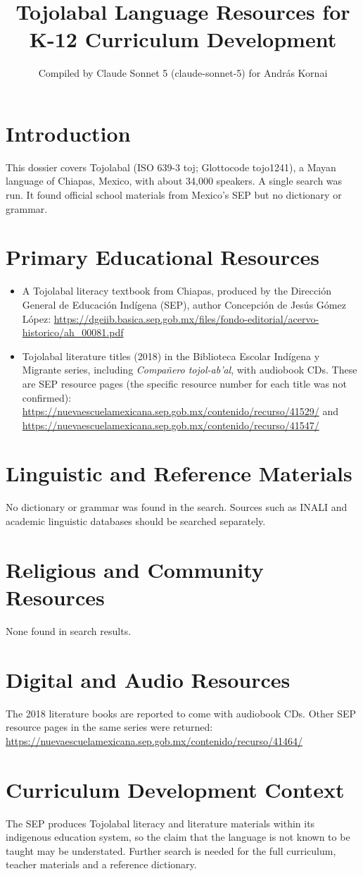 \documentclass[12pt]{article}
\title{Tojolabal Language Resources for K-12 Curriculum Development}
\author{Compiled by Claude Sonnet 5 (claude-sonnet-5) for Andr\'as Kornai}
\date{}
\begin{document}
\maketitle

\section{Introduction}
This dossier covers Tojolabal (ISO 639-3 toj; Glottocode tojo1241), a Mayan language of Chiapas, Mexico, with about 34,000 speakers. A single search was run. It found official school materials from Mexico's SEP but no dictionary or grammar.

\section{Primary Educational Resources}
\begin{itemize}
\item A Tojolabal literacy textbook from Chiapas, produced by the Direcci\'on General de Educaci\'on Ind\'igena (SEP), author Concepci\'on de Jes\'us G\'omez L\'opez: \url{https://dgeiib.basica.sep.gob.mx/files/fondo-editorial/acervo-historico/ah_00081.pdf}
\item Tojolabal literature titles (2018) in the Biblioteca Escolar Ind\'igena y Migrante series, including \emph{Compa\~nero tojol-ab'al}, with audiobook CDs. These are SEP resource pages (the specific resource number for each title was not confirmed): \url{https://nuevaescuelamexicana.sep.gob.mx/contenido/recurso/41529/} and \url{https://nuevaescuelamexicana.sep.gob.mx/contenido/recurso/41547/}
\end{itemize}

\section{Linguistic and Reference Materials}
No dictionary or grammar was found in the search. Sources such as INALI and academic linguistic databases should be searched separately.

\section{Religious and Community Resources}
None found in search results.

\section{Digital and Audio Resources}
The 2018 literature books are reported to come with audiobook CDs. Other SEP resource pages in the same series were returned: \url{https://nuevaescuelamexicana.sep.gob.mx/contenido/recurso/41464/}

\section{Curriculum Development Context}
The SEP produces Tojolabal literacy and literature materials within its indigenous education system, so the claim that the language is not known to be taught may be understated. Further search is needed for the full curriculum, teacher materials and a reference dictionary.
\end{document}
